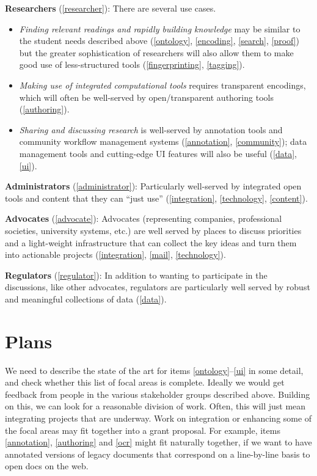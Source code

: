 \documentclass{article}
\begin{document}
\textbf{Researchers} (\ref{researcher}): There are several use cases. 
\begin{itemize}
\item \emph{Finding relevant readings and rapidly building knowledge} may be similar to the student needs described above (\ref{ontology}, \ref{encoding}, \ref{search}, \ref{proof}) but the greater sophistication of researchers will also allow them to make good use of less-structured tools (\ref{fingerprinting}, \ref{tagging}).
\item \emph{Making use of integrated computational tools} requires transparent encodings, which will often be well-served by open/transparent authoring tools (\ref{authoring}).
\item \emph{Sharing and discussing research} is well-served by annotation tools and community workflow management systems (\ref{annotation}, \ref{community}); data management tools and cutting-edge UI features will also be useful (\ref{data}, \ref{ui}).
\end{itemize}

\textbf{Administrators} (\ref{administrator}): Particularly well-served by integrated open tools and content that they can ``just use'' (\ref{integration}, \ref{technology}, \ref{content}).

\textbf{Advocates} (\ref{advocate}): Advocates (representing companies, professional societies, university systems, etc.) are well served by places to discuss priorities and a light-weight infrastructure that can collect the key ideas and turn them into actionable projects (\ref{integration}, \ref{mail}, \ref{technology}).

\textbf{Regulators} (\ref{regulator}): In addition to wanting to participate in the discussions, like other advocates, regulators are particularly well served by robust and meaningful collections of data (\ref{data}).

\section{Plans}

We need to describe the state of the art for items \ref{ontology}--\ref{ui} in some detail, and check whether this list of focal areas is complete.  Ideally we would get feedback from people in the various stakeholder groups described above.  Building on this, we can look for a reasonable division of work.  Often, this will just mean integrating projects that are underway.  Work on integration or enhancing some of the focal areas may fit together into a grant proposal.  For example, items \ref{annotation}, \ref{authoring} and \ref{ocr} might fit naturally together, if we want to have annotated versions of legacy documents that correspond on a line-by-line basis to open docs on the web.
\end{document}
